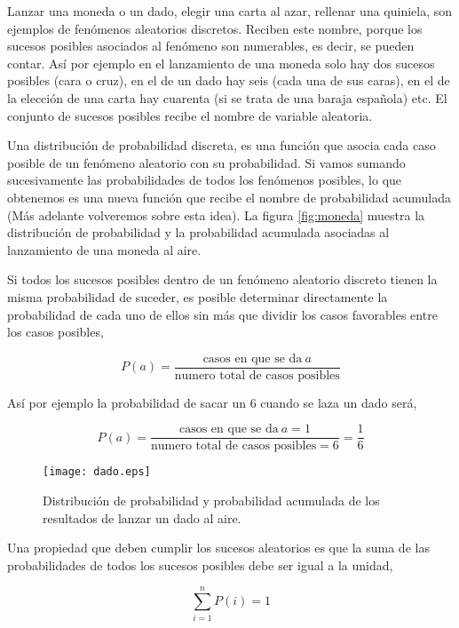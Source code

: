Lanzar una moneda o un dado, elegir una carta al azar, rellenar una quiniela, son ejemplos de fenómenos aleatorios discretos. Reciben este nombre, porque los sucesos posibles asociados al fenómeno son numerables, es decir, se pueden contar.  Así por ejemplo en el lanzamiento de una moneda solo hay dos sucesos posibles (cara o cruz), en el de un dado hay seis (cada una de sus caras), en el de la elección de una carta hay cuarenta (si se trata de una baraja española) etc. El conjunto de sucesos posibles recibe el nombre de variable aleatoria. 

Una distribución de probabilidad discreta, es una función que asocia cada caso posible de un fenómeno aleatorio con su probabilidad. Si vamos sumando sucesivamente las probabilidades de todos los fenómenos posibles, lo que obtenemos es una nueva función que recibe el nombre de probabilidad acumulada (Más adelante volveremos sobre esta idea). La figura \ref{fig:moneda} muestra la distribución de probabilidad y la probabilidad acumulada asociadas al lanzamiento de una moneda al aire.

Si todos los sucesos posibles dentro de un fenómeno aleatorio discreto tienen la misma probabilidad de suceder,  es posible determinar directamente la probabilidad de cada uno de ellos sin más que  dividir los casos favorables  entre los casos posibles,

\begin{equation*}
P(a)=\frac{\text{casos en que se da} \ a}{\text{numero total de casos posibles}}
\end{equation*}

Así por ejemplo la probabilidad de sacar un $6$ cuando se laza un dado será,

\begin{equation*}
P(a)=\frac{\text{casos en que se da}\ a=1}{\text{numero total de casos posibles}=6}=\frac{1}{6}
\end{equation*}

\begin{figure}
\centering
\texttt{[image: dado.eps]}
\caption{Distribución de probabilidad y probabilidad acumulada de los resultados de lanzar un dado al aire.}
\label{fig:dado}
\end{figure}


Una propiedad que deben cumplir los sucesos aleatorios es que la suma de las probabilidades de todos los sucesos posibles debe ser igual a la unidad,

\begin{equation*}
\sum_{i=1}^n P(i) = 1
\end{equation*}

